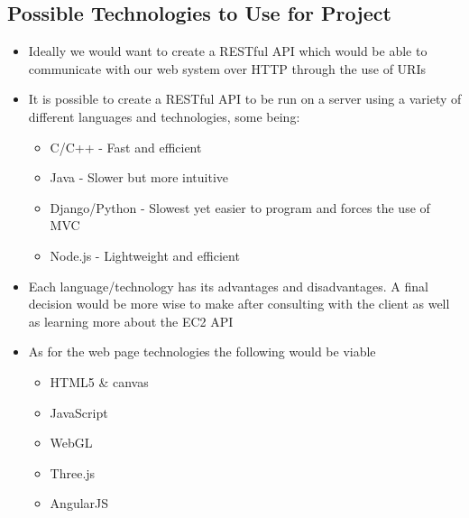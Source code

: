 \documentclass{article}
\begin{document}
	\subsection{Possible Technologies to Use for Project}
		\begin{itemize}
			\item Ideally we would want to create a RESTful API which would be able to communicate with our web system over HTTP through the use of URIs
			\item It is possible to create a RESTful API to be run on a server using a variety of different languages and technologies, some being:
			\begin{itemize}
				\item C/C++ - Fast and efficient
				\item Java - Slower but more intuitive
				\item Django/Python - Slowest yet easier to program and forces the use of MVC
				\item Node.js - Lightweight and efficient
			\end{itemize}
			\item Each language/technology has its advantages and disadvantages. A final decision would be more wise to make after consulting with the client as well as learning more about the EC2 API
			\item As for the web page technologies the following would be viable
			\begin{itemize}
				\item HTML5 \& canvas
				\item JavaScript
				\item WebGL
				\item Three.js
				\item AngularJS
			\end{itemize}
		\end{itemize}
\end{document}
